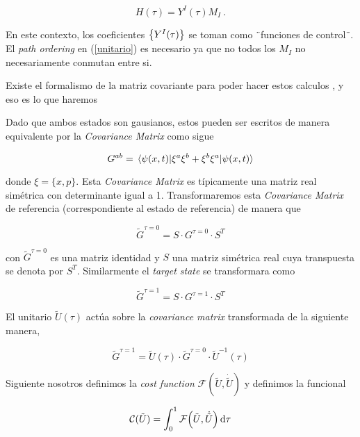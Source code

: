 \documentclass[../Main.tex]{subfiles}
\begin{document}
\begin{equation}
 H(\tau)= Y^{I}(\tau) M_{I} \ .
\nonumber
\end{equation}

En este contexto, los coeficientes $\Bqty{Y^{I}(\tau)}$ se toman como ¨funciones de control¨. El \textit{path ordering} en (\eqref{unitario}) es necesario ya que no todos los $M_I$ no necesariamente conmutan entre si.

Existe el formalismo de la matriz covariante para poder hacer estos calculos \citep{Braunstein:2005zz}, y eso es lo que haremos

Dado que ambos estados son gausianos, estos pueden ser escritos de manera equivalente por la \textit{Covariance Matrix} como sigue\citep{Weedbrook_2012}

\begin{equation}
G^{ab}=\ev{\xi^{a}\xi^{b}+\xi^{b}\xi^{a}}{\psi(x,t)}
\end{equation} 

donde $\xi=\{x ,p\}$. Esta \textit{Covariance Matrix} es típicamente una matriz real simétrica con determinante igual a 1. Transformaremos esta \textit{Covariance Matrix} de referencia (correspondiente al estado de referencia) de manera que \cite{jmca, me1}

\begin{equation}
\tilde G^{\tau=0}= S\cdot G^{\tau=0}\cdot S^T
\end{equation}

con $\tilde G^{\tau=0}$ es una matriz identidad y $S$ una matriz simétrica real cuya transpuesta se denota por $S^T$. Similarmente el \textit{target state} se transformara como

\begin{equation}
\tilde G^{\tau=1}= S\cdot G^{\tau=1}\cdot S^{T}
\end{equation}

El unitario $\tilde U(\tau)$ actúa sobre la \textit{covariance matrix} transformada de la siguiente manera,

\begin{equation}
\tilde G^{\tau=1}= \tilde U(\tau)\cdot \tilde G^{\tau=0}\cdot\tilde U^{-1}(\tau)
\end{equation}

Siguiente nosotros definimos la \textit{cost function}  $\mathcal{F}(\tilde U, \dot {\tilde U})$ y definimos la funcional \citep{Ali_2019}

\begin{equation}
\mathcal{C}(\tilde U)=\int_{0}^{1} \mathcal{F}\pqty{\tilde U,\dot{\tilde U}} \dd{\tau} 
\end{equation}
\end{document}
